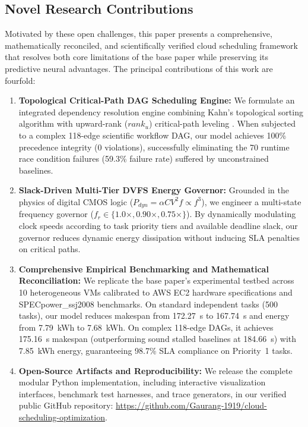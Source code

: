 \documentclass[default,sn-mathphys-num]{sn-jnl}
\theoremstyle{thmstyleone}
\theoremstyle{thmstyletwo}
\theoremstyle{thmstylethree}
\begin{document}
\subsection{Novel Research Contributions}
Motivated by these open challenges, this paper presents a comprehensive, mathematically reconciled, and scientifically verified cloud scheduling framework that resolves both core limitations of the base paper while preserving its predictive neural advantages. The principal contributions of this work are fourfold:
\begin{enumerate}
    \item \textbf{Topological Critical-Path DAG Scheduling Engine:} We formulate an integrated dependency resolution engine combining Kahn's topological sorting algorithm \cite{kahn1962topological} with upward-rank ($rank_u$) critical-path leveling \cite{topcuoglu2002performance}. When subjected to a complex 118-edge scientific workflow DAG, our model achieves 100\% precedence integrity (0 violations), successfully eliminating the 70 runtime race condition failures (59.3\% failure rate) suffered by unconstrained baselines.
    \item \textbf{Slack-Driven Multi-Tier DVFS Energy Governor:} Grounded in the physics of digital CMOS logic ($P_{dyn} = \alpha C V^2 f \propto f^3$), we engineer a multi-state frequency governor ($f_r \in \{1.0\times, 0.90\times, 0.75\times\}$). By dynamically modulating clock speeds according to task priority tiers and available deadline slack, our governor reduces dynamic energy dissipation without inducing SLA penalties on critical paths.
    \item \textbf{Comprehensive Empirical Benchmarking and Mathematical Reconciliation:} We replicate the base paper's experimental testbed across 10 heterogeneous VMs calibrated to AWS EC2 hardware specifications and SPECpower\_ssj2008 benchmarks. On standard independent tasks (500 tasks), our model reduces makespan from 172.27~s to 167.74~s and energy from 7.79~kWh to 7.68~kWh. On complex 118-edge DAGs, it achieves 175.16~s makespan (outperforming sound stalled baselines at 184.66~s) with 7.85~kWh energy, guaranteeing 98.7\% SLA compliance on Priority~1 tasks.
    \item \textbf{Open-Source Artifacts and Reproducibility:} We release the complete modular Python implementation, including interactive visualization interfaces, benchmark test harnesses, and trace generators, in our verified public GitHub repository: \url{https://github.com/Gaurang-1919/cloud-scheduling-optimization}.
\end{enumerate}
\end{document}
